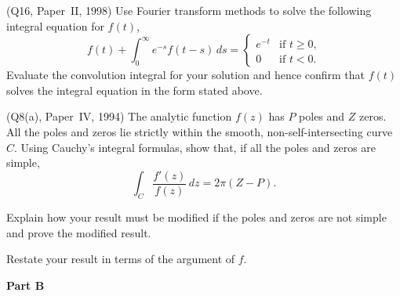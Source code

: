 \begin{question} (Q16, Paper~II, 1998) Use Fourier transform
methods to solve the following integral equation
for $f(t)$,
\begin{equation*}
f(t)+\int_{0}^{\infty}e^{-s}f(t-s)\,ds=
\begin{cases}
e^{-t}& \text{if $t\geq 0$,}\\
0& \text{if $t<0$.}
\end{cases}
\end{equation*}
Evaluate the convolution integral for your solution
and hence confirm that $f(t)$ solves the
integral equation in the form stated above.
\end{question}

\begin{question} (Q8(a), Paper~IV, 1994)
The analytic function $f(z)$ has $P$ poles and $Z$ zeros.
All the poles and zeros lie strictly within the smooth,
non-self-intersecting curve $C$. Using Cauchy's integral
formulas, show that, if all the poles and zeros are simple,
\[\int_{C}\frac{f'(z)}{f(z)}\,dz=2\pi(Z-P).\]

Explain how your result must be modified if the poles and zeros
are not simple and prove the modified result.

Restate your result in terms of the argument of $f$.
\end{question}

\begin{center}
\bf{Part B}
\end{center}

